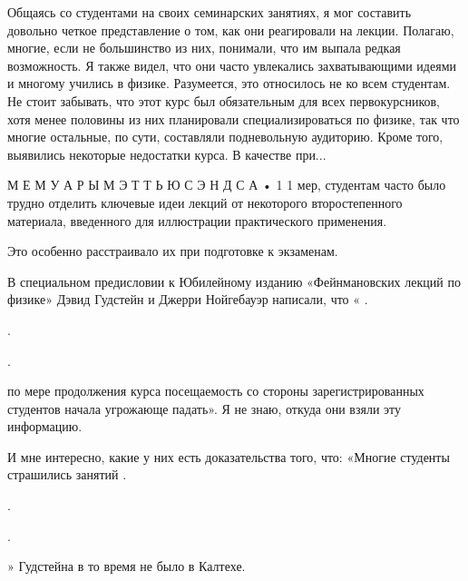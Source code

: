 \documentclass[11pt,oneside]{article}
\begin{document}
Общаясь со студентами на своих семинарских занятиях, я мог составить довольно четкое представление о том, как они реагировали на лекции. Полагаю, многие, если не большинство из них, понимали, что им выпала редкая возможность. Я также видел, что они часто увлекались захватывающими идеями и многому учились в физике. Разумеется, это относилось не ко всем студентам. Не стоит забывать, что этот курс был обязательным для всех первокурсников, хотя менее половины из них планировали специализироваться по физике, так что многие остальные, по сути, составляли подневольную аудиторию. Кроме того, выявились некоторые недостатки курса. В качестве при...\par



М Е М У А Р Ы  М Э Т Т Ь Ю  С Э Н Д С А • 1 1 мер, студентам часто было трудно отделить ключевые идеи лекций от некоторого второстепенного материала, введенного для иллюстрации практического применения.\par



Это особенно расстраивало их при подготовке к экзаменам.\par



В специальном предисловии к Юбилейному изданию «Фейнмановских лекций по физике» Дэвид Гудстейн и Джерри Нойгебауэр написали, что « .\par



.\par



.\par



по мере продолжения курса посещаемость со стороны зарегистрированных студентов начала угрожающе падать». Я не знаю, откуда они взяли эту информацию.\par



И мне интересно, какие у них есть доказательства того, что: «Многие студенты страшились занятий .\par



.\par



.\par



» Гудстейна в то время не было в Калтехе.\par
\end{document}
